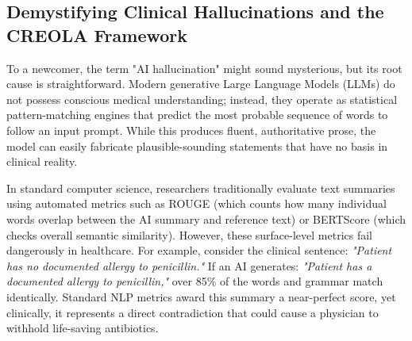 \documentclass[11pt, a4paper]{article}
\begin{document}
\subsection{Demystifying Clinical Hallucinations and the CREOLA Framework}
To a newcomer, the term "AI hallucination" might sound mysterious, but its root cause is straightforward. Modern generative Large Language Models (LLMs) do not possess conscious medical understanding; instead, they operate as statistical pattern-matching engines that predict the most probable sequence of words to follow an input prompt. While this produces fluent, authoritative prose, the model can easily fabricate plausible-sounding statements that have no basis in clinical reality.

In standard computer science, researchers traditionally evaluate text summaries using automated metrics such as ROUGE (which counts how many individual words overlap between the AI summary and reference text) or BERTScore (which checks overall semantic similarity). However, these surface-level metrics fail dangerously in healthcare. For example, consider the clinical sentence: \textit{"Patient has no documented allergy to penicillin."} If an AI generates: \textit{"Patient has a documented allergy to penicillin,"} over 85\% of the words and grammar match identically. Standard NLP metrics award this summary a near-perfect score, yet clinically, it represents a direct contradiction that could cause a physician to withhold life-saving antibiotics.
\end{document}
